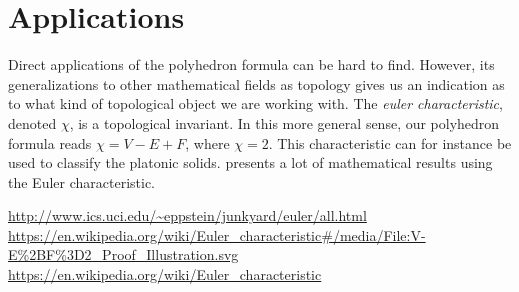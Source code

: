 \documentclass{amsart}
\theoremstyle{plain}
\theoremstyle{definition}
\begin{document}
\section{Applications}
\label{sec:applications}

Direct applications of the polyhedron formula can be hard to find. However, its
generalizations to other mathematical fields as topology gives us an indication
as to what kind of topological object we are working with. The \emph{euler
characteristic}, denoted $\chi$, is a topological invariant. In this more
general sense, our polyhedron formula reads $\chi = V - E + F$, where $\chi =
2$. This characteristic can for instance be used to classify the platonic
solids. \cite{chi} presents a lot of mathematical results using the Euler
characteristic.

\begin{thebibliography}{2}
        \url{http://www.ics.uci.edu/~eppstein/junkyard/euler/all.html}
        \url{https://en.wikipedia.org/wiki/Euler_characteristic#/media/File:V-E%2BF%3D2_Proof_Illustration.svg}
        \url{https://en.wikipedia.org/wiki/Euler_characteristic}
\end{thebibliography}
\end{document}
